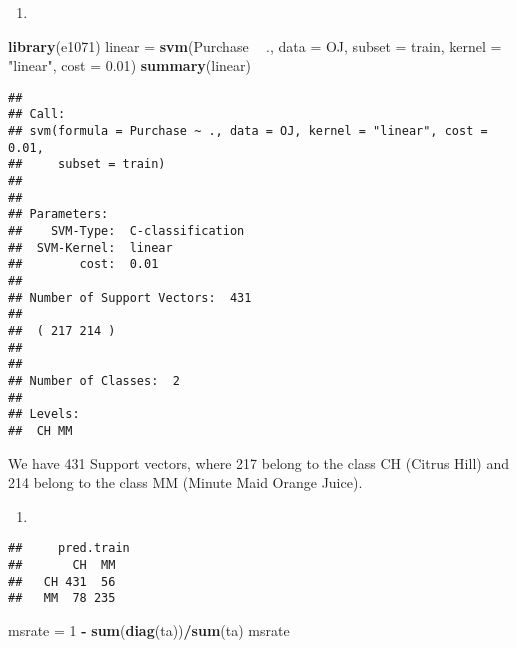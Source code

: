\documentclass[]{article}
\newenvironment{Shaded}{\begin{snugshade}}{\end{snugshade}}
\newcommand{\DataTypeTok}[1]{\textcolor[rgb]{0.13,0.29,0.53}{#1}}
\newcommand{\DecValTok}[1]{\textcolor[rgb]{0.00,0.00,0.81}{#1}}
\newcommand{\FloatTok}[1]{\textcolor[rgb]{0.00,0.00,0.81}{#1}}
\newcommand{\KeywordTok}[1]{\textcolor[rgb]{0.13,0.29,0.53}{\textbf{#1}}}
\newcommand{\NormalTok}[1]{#1}
\newcommand{\OperatorTok}[1]{\textcolor[rgb]{0.81,0.36,0.00}{\textbf{#1}}}
\newcommand{\StringTok}[1]{\textcolor[rgb]{0.31,0.60,0.02}{#1}}
\begin{document}
\begin{enumerate}
\def\labelenumi{(\alph{enumi})}
\setcounter{enumi}{1}
\item
\end{enumerate}

\begin{Shaded}
\begin{Highlighting}[]
\KeywordTok{library}\NormalTok{(e1071)}
\NormalTok{linear =}\StringTok{ }\KeywordTok{svm}\NormalTok{(Purchase }\OperatorTok{~}\StringTok{ }\NormalTok{., }\DataTypeTok{data =}\NormalTok{ OJ, }\DataTypeTok{subset =}\NormalTok{ train, }\DataTypeTok{kernel =} \StringTok{"linear"}\NormalTok{, }\DataTypeTok{cost =} \FloatTok{0.01}\NormalTok{)}
\KeywordTok{summary}\NormalTok{(linear)}
\end{Highlighting}
\end{Shaded}

\begin{verbatim}
## 
## Call:
## svm(formula = Purchase ~ ., data = OJ, kernel = "linear", cost = 0.01, 
##     subset = train)
## 
## 
## Parameters:
##    SVM-Type:  C-classification 
##  SVM-Kernel:  linear 
##        cost:  0.01 
## 
## Number of Support Vectors:  431
## 
##  ( 217 214 )
## 
## 
## Number of Classes:  2 
## 
## Levels: 
##  CH MM
\end{verbatim}

We have 431 Support vectors, where 217 belong to the class CH (Citrus
Hill) and 214 belong to the class MM (Minute Maid Orange Juice).

\begin{enumerate}
\def\labelenumi{(\alph{enumi})}
\setcounter{enumi}{2}
\item
\end{enumerate}

\begin{Shaded}
\end{Shaded}

\begin{verbatim}
##     pred.train
##       CH  MM
##   CH 431  56
##   MM  78 235
\end{verbatim}

\begin{Shaded}
\begin{Highlighting}[]
\NormalTok{msrate =}\StringTok{ }\DecValTok{1} \OperatorTok{-}\StringTok{ }\KeywordTok{sum}\NormalTok{(}\KeywordTok{diag}\NormalTok{(ta))}\OperatorTok{/}\KeywordTok{sum}\NormalTok{(ta)}
\NormalTok{msrate}
\end{Highlighting}
\end{Shaded}
\end{document}
